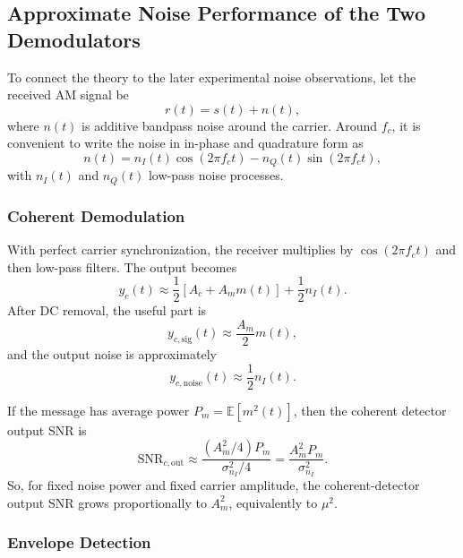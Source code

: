 \subsection{Approximate Noise Performance of the Two Demodulators}
\label{sec:lab2_noise_performance}

To connect the theory to the later experimental noise observations, let the
received AM signal be
\begin{equation}
r(t)=s(t)+n(t),
\end{equation}
where $n(t)$ is additive bandpass noise around the carrier. Around $f_c$, it is
convenient to write the noise in in-phase and quadrature form as
\begin{equation}
n(t)=n_I(t)\cos(2\pi f_c t)-n_Q(t)\sin(2\pi f_c t),
\end{equation}
with $n_I(t)$ and $n_Q(t)$ low-pass noise processes.

\subsubsection{Coherent Demodulation}

With perfect carrier synchronization, the receiver multiplies by
$\cos(2\pi f_c t)$ and then low-pass filters. The output becomes
\begin{equation}
y_c(t)\approx \frac{1}{2}\left[A_c+A_m m(t)\right]+\frac{1}{2}n_I(t).
\end{equation}
After DC removal, the useful part is
\begin{equation}
y_{c,\mathrm{sig}}(t)\approx \frac{A_m}{2}m(t),
\end{equation}
and the output noise is approximately
\begin{equation}
y_{c,\mathrm{noise}}(t)\approx \frac{1}{2}n_I(t).
\end{equation}

If the message has average power $P_m=\mathbb{E}[m^2(t)]$, then the coherent
detector output SNR is
\begin{equation}
\mathrm{SNR}_{c,\mathrm{out}}
\approx
\frac{(A_m^2/4)P_m}{\sigma_{n_I}^2/4}
=
\frac{A_m^2 P_m}{\sigma_{n_I}^2}.
\label{eq:lab2_snr_coherent}
\end{equation}
So, for fixed noise power and fixed carrier amplitude, the coherent-detector
output SNR grows proportionally to $A_m^2$, equivalently to $\mu^2$.

\subsubsection{Envelope Detection}

